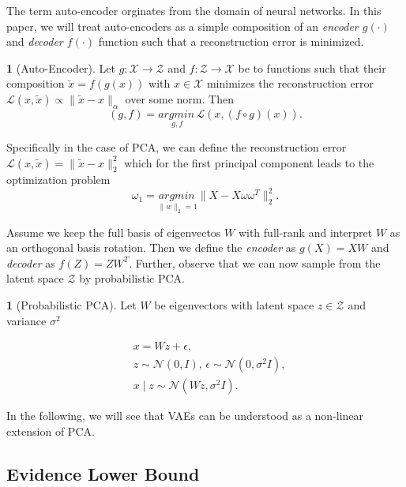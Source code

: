 \documentclass[11pt]{article}
\theoremstyle{plain}
\theoremstyle{definition}
\newtheorem{defn}[thm]{\protect\definitionname}
\theoremstyle{plain}
\providecommand{\definitionname}{Definition}
\begin{document}
The term auto-encoder orginates from the domain of neural networks.
In this paper, we will treat auto-encoders as a simple composition
of an \textit{encoder $g(\cdot)$} and \textit{decoder $f(\cdot)$}
function such that a reconstruction error is minimized. 
\begin{defn}[Auto-Encoder]
Let $g:\mathcal{X}\rightarrow\mathcal{Z}$ and $f:\mathcal{Z}\rightarrow\mathcal{X}$
be to functions such that their composition $\tilde{x}=f(g(x))$ with
$x\in\mathcal{X}$ minimizes the reconstruction error $\mathcal{L}(x,\tilde{x})\propto\lVert\tilde{x}-x\rVert_{\alpha}$
over some norm. Then
\begin{equation}
(g,f)=\underset{g,f}{argmin\,}\mathcal{L}(x,(f\circ g)(x)).
\end{equation}
\end{defn}
\noindent Specifically in the case of PCA, we can define the reconstruction
error $\mathcal{L}(x,\tilde{x})=\lVert\tilde{x}-x\rVert_{2}^{2}$
which for the first principal component leads to the optimization
problem
\begin{equation}
\omega_{1}=\underset{\lVert w\rVert_{2}=1}{argmin\,}\lVert X-X\omega\omega^{T}\rVert_{2}^{2}.
\end{equation}

\noindent Assume we keep the full basis of eigenvectos $W$ with full-rank
and interpret $W$ as an orthogonal basis rotation. Then we define
the \textit{encoder} as $g(X)=XW$ and \textit{decoder} as $f(Z)=ZW^{T}$.
Further, observe that we can now sample from the latent space $\mathcal{Z}$
by probabilistic PCA.
\begin{defn}[Probabilistic PCA]
 Let $W$ be eigenvectors with latent space $z\in\mathcal{Z}$ and
variance $\sigma^{2}$

\begin{equation}
\begin{array}{cc}
 & x=Wz+\epsilon,\\
 & z\sim\mathcal{N}(0,I),\,\epsilon\sim\mathcal{N}(0,\sigma^{2}I),\\
 & x\mid z\sim\mathcal{N}(Wz,\sigma^{2}I).
\end{array}
\end{equation}
\end{defn}
In the following, we will see that VAEs can be understood as a non-linear
extension of PCA.

\subsection{Evidence Lower Bound}
\end{document}
